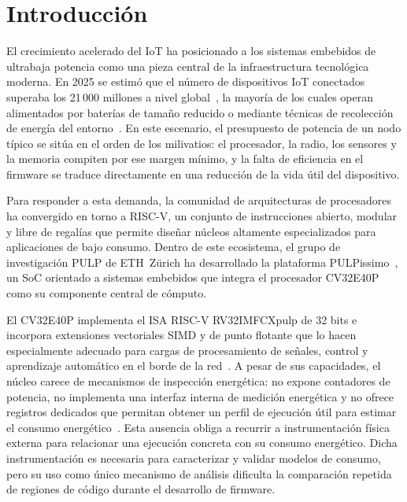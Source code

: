 \chapter{Introducción}
\label{ch:intro}

El crecimiento acelerado del IoT ha posicionado a los
sistemas embebidos de ultrabaja potencia como una pieza central de la
infraestructura tecnológica moderna. En 2025 se estimó que el número de
dispositivos IoT conectados superaba los
21\,000 millones a nivel global~\cite{iotanalytics2025},
la mayoría de los cuales operan alimentados por baterías de tamaño reducido
o mediante técnicas de recolección de energía del entorno~\cite{iotlowpowersurvey}. En este escenario,
el presupuesto de potencia de un nodo típico se sitúa en el orden de los
milivatios: el procesador, la radio, los sensores y la memoria compiten por
ese margen mínimo, y la falta de eficiencia en el firmware se traduce
directamente en una reducción de la vida útil del dispositivo.

Para responder a esta demanda, la comunidad de arquitecturas de procesadores ha
convergido en torno a RISC-V, un conjunto de instrucciones abierto, modular y
libre de regalías que permite diseñar núcleos altamente especializados para
aplicaciones de bajo consumo. Dentro de este ecosistema, el grupo de investigación PULP de ETH~Zürich ha desarrollado la plataforma PULPissimo~\cite{pulpissimo}, un
SoC orientado a sistemas embebidos que integra el procesador CV32E40P~\cite{cv32e40p} como su componente central de cómputo.

El CV32E40P implementa el ISA RISC-V RV32IMFCXpulp de 32 bits e incorpora
extensiones vectoriales SIMD y de punto flotante que lo hacen especialmente
adecuado para cargas de procesamiento de señales, control y aprendizaje
automático en el borde de la red~\cite{cv32e40p}. A pesar de sus capacidades, el núcleo carece de mecanismos de inspección energética: no expone contadores de potencia,
no implementa una interfaz interna de medición energética y no ofrece registros
dedicados que permitan obtener un perfil de ejecución útil para estimar el
consumo energético~\cite{leonvega2024efimon}.
Esta ausencia obliga a recurrir a instrumentación física externa para relacionar
una ejecución concreta con su consumo energético. Dicha instrumentación es
necesaria para caracterizar y validar modelos de consumo, pero su uso como único
mecanismo de análisis dificulta la comparación repetida de regiones de código
durante el desarrollo de firmware.

